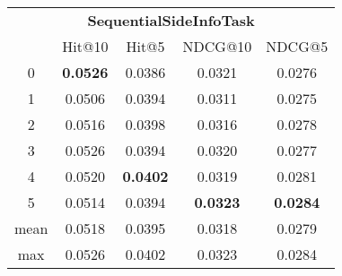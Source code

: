 \documentclass{article}
\begin{document}
 

\begin{tabular}{c|cccc}

\multicolumn{5}{c}{\textbf{SequentialSideInfoTask}} \\
\noalign{\smallskip}
\noalign{\smallskip}
\toprule
\multicolumn{1}{c}{Template ID} & \multicolumn{1}{|c}{Hit@10} & \multicolumn{1}{c}{Hit@5} & \multicolumn{1}{c}{NDCG@10} & \multicolumn{1}{c}{NDCG@5} \\
\midrule
0 & \textbf{0.0526} & 0.0386 & 0.0321 & 0.0276 \\
1 & 0.0506 & 0.0394 & 0.0311 & 0.0275 \\
2 & 0.0516 & 0.0398 & 0.0316 & 0.0278 \\
3 & 0.0526 & 0.0394 & 0.0320 & 0.0277 \\
4 & 0.0520 & \textbf{0.0402} & 0.0319 & 0.0281 \\
5 & 0.0514 & 0.0394 & \textbf{0.0323} & \textbf{0.0284} \\
\midrule
mean & 0.0518 & 0.0395 & 0.0318 & 0.0279 \\
max & 0.0526 & 0.0402 & 0.0323 & 0.0284 \\
\bottomrule

\end{tabular}
\end{document}

